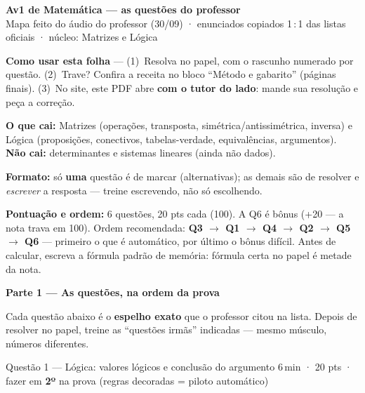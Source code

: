 \documentclass[11pt]{article}
\newcommand{\meta}[1]{{\small\color{inkgray}#1}}
\begin{document}
{\Large\bfseries Av1 de Matemática — as questões do professor}\\[3pt]
{\small\color{inkgray}Mapa feito do áudio do professor (30/09) · enunciados copiados 1\,:\,1 das listas oficiais · núcleo: Matrizes e Lógica}

\vspace{6pt}
\begin{strategiabox}
\textbf{\color{amberdeep}Como usar esta folha} — (1)~Resolva no papel, com o rascunho numerado por questão. (2)~Trave? Confira a receita no bloco ``Método e gabarito'' (páginas finais). (3)~No site, este PDF abre \textbf{com o tutor do lado}: mande sua resolução e peça a correção.

\vspace{4pt}
\textbf{\color{amberdeep}O que cai:} Matrizes (operações, transposta, simétrica/antissimétrica, inversa) e Lógica (proposições, conectivos, tabelas-verdade, equivalências, argumentos). \textbf{Não cai:} determinantes e sistemas lineares (ainda não dados).

\vspace{4pt}
\textbf{\color{amberdeep}Formato:} só \textbf{uma} questão é de marcar (alternativas); as demais são de resolver e \emph{escrever} a resposta — treine escrevendo, não só escolhendo.

\vspace{4pt}
\textbf{\color{amberdeep}Pontuação e ordem:} 6 questões, 20 pts cada (100). A Q6 é bônus (+20 — a nota trava em 100). Ordem recomendada: \textbf{Q3 $\to$ Q1 $\to$ Q4 $\to$ Q2 $\to$ Q5 $\to$ Q6} — primeiro o que é automático, por último o bônus difícil. Antes de calcular, escreva a fórmula padrão de memória: fórmula certa no papel é metade da nota.
\end{strategiabox}

\vspace{4pt}
{\large\bfseries\color{violetdark}Parte 1 — As questões, na ordem da prova}

\vspace{2pt}
\meta{Cada questão abaixo é o \textbf{espelho exato} que o professor citou na lista. Depois de resolver no papel, treine as ``questões irmãs'' indicadas — mesmo músculo, números diferentes.}

\begin{questaobox}{Questão 1 — Lógica: valores lógicos e conclusão do argumento}
\meta{6\,min · 20 pts · fazer em \textbf{2º} na prova (regras decoradas = piloto automático)}
\end{questaobox}
\end{document}
